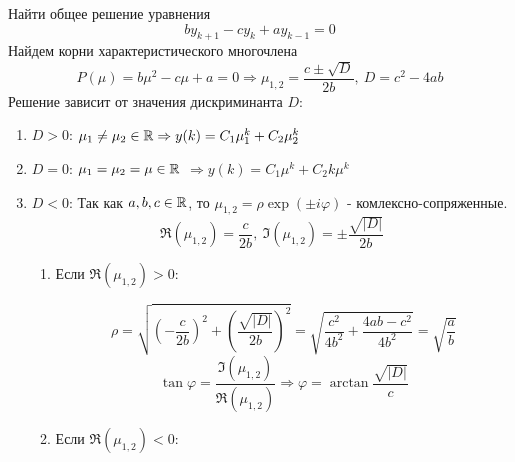 \begin{example}
  Найти общее решение уравнения
  \[by_{k+1}-cy_k+ay_{k-1}=0\]
  Найдем корни характеристического многочлена
  \[P(\mu)=b\mu^2-c\mu+a=0 \Rightarrow \mu_{1,2}=\frac{c\pm\sqrt{D}}{2b},\ D=c^2-4ab \]
  Решение зависит от значения дискриминанта $D$:
  \begin{enumerate}
    \item $D>0$: $\mu_1\neq\mu_2\in\mathbb{R}\Rightarrow y(k)=C_1\mu_1^k+C_2\mu_2^k$
    \item $D=0$: $\mu_1=\mu_2=\mu\in\mathbb{R}$ $\Rightarrow y(k)=C_1\mu^k+C_2k\mu^k$
    \item $D<0$: Так как $a,b,c\in\mathbb{R}$, то $\mu_{1,2}=\rho\exp{(\pm i \varphi)}$ - комлексно-сопряженные.
          \[\Re(\mu_{1,2})=\frac{c}{2b},\ \Im(\mu_{1,2})=\pm\frac{\sqrt{|D|}}{2b}\]
          \begin{enumerate}
            \item Если $\Re(\mu_{1,2})>0$:

                  \begin{minipage}{.3\linewidth}
                  \end{minipage}\hfill
                  \begin{minipage}{.7\linewidth}
                    \[\rho=\sqrt{\left(-\frac{c}{2b}\right)^2 + \left(\frac{\sqrt{|D|}}{2b}\right)^2}=\sqrt{\frac{c^2}{4b^2} + \frac{4ab-c^2}{4b^2}}=\sqrt{\frac{a}{b}}\]
                    \[\tan{\varphi}=\frac{\Im(\mu_{1,2})}{\Re(\mu_{1,2})}\Rightarrow\varphi=\arctan{\frac{\sqrt{|D|}}{c}}\]
                  \end{minipage}
            \item Если $\Re(\mu_{1,2})<0$:


\end{enumerate}
\end{enumerate}
\end{example}

